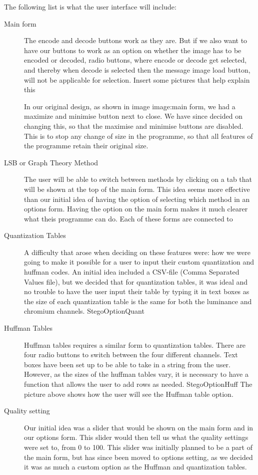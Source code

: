 The following list is what the user interface will include:
\begin{description}
    \item[Main form]
The encode and decode buttons work as they are. But if we also want to have our buttons to work as an option on whether the image has to be encoded or decoded, radio buttons, where encode or decode get selected, and thereby when decode is selected then the message image load button, will not be applicable for selection. {Insert some pictures that help explain this}

In our original design, as shown in image {image:main form}, we had a maximize and minimise button next to close. We have since decided on changing this, so that the maximise and minimise buttons are disabled. This is to stop any change of size in the programme, so that all features of the programme retain their original size.

\item[LSB or Graph Theory Method]
The user will be able to switch between methods by clicking on a tab that will be shown at the top of the main form. This idea seems more effective than our initial idea of having the option of selecting which method in an options form. Having the option on the main form makes it much clearer what theis programme can do. Each of these forms are connected to 

\item[Quantization Tables]
A difficulty that arose when deciding on these features were: how we were going to make it possible for a user to input their custom quantization and huffman codes.
An initial idea included a CSV-file (Comma Separated Values file), but we decided that for quantization tables, it was ideal and no trouble to have the user input their table by typing it in text boxes as the size of each quantization table is the same for both the luminance and chromium channels.
{StegoOptionQuant}

\item[Huffman Tables]
Huffman tables requires a similar form to quantization tables. There are four radio buttons to switch between the four different channels. Text boxes have been set up to be able to take in a string from the user. However, as the sizes of the huffman tables vary, it is necessary to have a function that allows the user to add rows as needed.
{StegoOptionHuff}
The picture above shows how the user will see the Huffman table option.

\item[Quality setting]
Our initial idea was a slider that would be shown on the main form and in our options form. This slider would then tell us what the quality settings were set to, from 0 to 100. This slider was initially planned to be a part of the main form, but has since been moved to options setting, as we decided it was as much a custom option as the Huffman and quantization tables.


\end{description}
